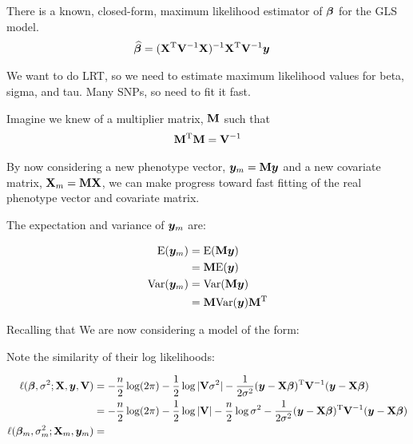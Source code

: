 There is a known, closed-form, maximum likelihood estimator of $\bm{\beta}$ for the GLS model.
\begin{align}
	\widehat{\bm{\beta}} &= (\mathbf{X} ^\mathrm{T} \mathbf{V} ^{-1} \mathbf{X}) ^{-1} \mathbf{X} ^\mathrm{T} \mathbf{V} ^{-1} \bm{y}
\end{align}

We want to do LRT, so we need to estimate maximum likelihood values for beta, sigma, and tau.
Many SNPs, so need to fit it fast.


Imagine we knew of a multiplier matrix, $\mathbf{M}$ such that
\begin{align}
	\mathbf{M} ^\mathrm{T} \mathbf{M} = \mathbf{V} ^{-1}
\end{align}
 
By now considering a new phenotype vector, $\bm{y}_m = \mathbf{M} \bm{y}$ and a new covariate matrix, $\mathbf{X}_m = \mathbf{M} \mathbf{X}$, we can make progress toward fast fitting of the real phenotype vector and covariate matrix.

The expectation and variance of $\bm{y}_m$ are:

\begin{align}
\text{E}(\bm{y}_m)	&= \text{E}(\mathbf{M} \bm{y}) \\
			&= \mathbf{M} \text{E}(\bm{y})\\
\text{Var}(\bm{y}_m)	&= \text{Var}(\mathbf{M} \bm{y})\\
			&= \mathbf{M} \text{Var}(\bm{y}) \mathbf{M}^\mathrm{T}
\end{align}

Recalling that We are now considering a model of the form:

Note the similarity of their log likelihoods:

\begin{align}
	\ell(\bm{\beta}, \sigma^2; \mathbf{X}, \bm{y}, \mathbf{V}) &= 
    	-\frac{n}{2}\log(2\pi)
        -\frac{1}{2}\log|\mathbf{V}\sigma^2|
        -         	\frac{1}{2\sigma^2}
            (\bm{y}-\mathbf{X}\bm{\beta})^\mathrm{T}\mathbf{V}^{-1}(\bm{y}-\mathbf{X}\bm{\beta}) \\
	&= 
    	-\frac{n}{2}\log(2\pi)
        -\frac{1}{2}\log|\mathbf{V}|
        -\frac{n}{2}\log\sigma^2
        - \frac{1}{2\sigma^2}
        	(\bm{y}-\mathbf{X}\bm{\beta})^\mathrm{T}\mathbf{V}^{-1}(\bm{y}-\mathbf{X}\bm{\beta})\\
    \ell(\bm{\beta}_m, \sigma_m^2; \mathbf{X}_m, \bm{y}_m) & =
\end{align}


